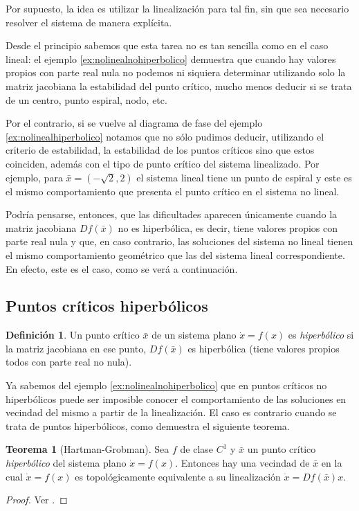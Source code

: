 \documentclass[11pt]{book}
\theoremstyle{definition}
\newtheorem{definition}{Definición}
\numberwithin{definition}{section}
\theoremstyle{theorem}
\newtheorem{theorem}{Teorema}
\numberwithin{theorem}{section}
\numberwithin{lemma}{section}
\numberwithin{corollary}{section}
\theoremstyle{plain}
\numberwithin{example}{section}
\begin{document}
Por supuesto, la idea es utilizar la linealización para tal fin, sin que sea necesario resolver el sistema de manera explícita.

Desde el principio sabemos que esta tarea no es tan sencilla como en el caso lineal: el ejemplo \ref{ex:nolinealnohiperbolico} demuestra que cuando hay valores propios con parte real nula no podemos ni siquiera determinar utilizando solo la matriz jacobiana la estabilidad del punto crítico, mucho menos deducir si se trata de un centro, punto espiral, nodo, etc.

Por el contrario, si se vuelve al diagrama de fase del ejemplo \ref{ex:nolinealhiperbolico} notamos que no sólo pudimos deducir, utilizando el criterio de estabilidad, la estabilidad de los puntos críticos sino que estos coinciden, además con el tipo de punto crítico del sistema linealizado. Por ejemplo, para $\bar{x} = (-\sqrt{2},2)$ el sistema lineal tiene un punto de espiral y este es el mismo comportamiento que presenta el punto crítico en el sistema no lineal.

Podría pensarse, entonces, que las dificultades aparecen únicamente cuando la matriz jacobiana $Df(\bar{x})$ no es hiperbólica, es decir, tiene valores propios con parte real nula y que, en caso contrario, las soluciones del sistema no lineal tienen el mismo comportamiento geométrico que las del sistema lineal correspondiente. En efecto, este es el caso, como se verá a continuación.

\subsection{Puntos críticos hiperbólicos}

\begin{definition}Un punto crítico $\bar{x}$ de un sistema plano $\dot{x} = f(x)$ es \emph{hiperbólico} si la matriz jacobiana en ese punto, $Df(\bar{x})$ es hiperbólica (tiene valores propios todos con parte real no nula).
\end{definition}

Ya sabemos del ejemplo \ref{ex:nolinealnohiperbolico} que en puntos críticos no hiperbólicos puede ser imposible conocer el comportamiento de las soluciones en vecindad del mismo a partir de la linealización. El caso es contrario cuando se trata de puntos hiperbólicos, como demuestra el siguiente teorema.

\begin{theorem}[Hartman-Grobman] \label{teo:hartmangrobman}
Sea $f$ de clase $C^1$ y $\bar{x}$ un punto crítico \emph{hiperbólico} del sistema plano $\dot{x} = f(x)$. Entonces hay una vecindad de $\bar{x}$ en la cual $\dot{x} = f(x)$ es topológicamente equivalente a su linealización $\dot{x} = Df(\bar{x})x$.
\begin{proof}
Ver \cite[p.~136]{barrvalls}.
\end{proof}
\end{theorem}
\end{document}

